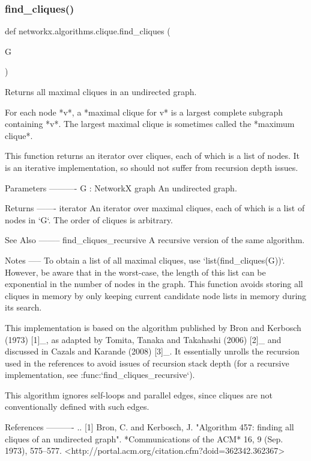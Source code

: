\subsubsection{\texorpdfstring{find\+\_\+cliques()}{find\_cliques()}}
{\footnotesize\ttfamily def networkx.\+algorithms.\+clique.\+find\+\_\+cliques (\begin{DoxyParamCaption}\item[{}]{G }\end{DoxyParamCaption})}

\begin{DoxyVerb}Returns all maximal cliques in an undirected graph.

For each node *v*, a *maximal clique for v* is a largest complete
subgraph containing *v*. The largest maximal clique is sometimes
called the *maximum clique*.

This function returns an iterator over cliques, each of which is a
list of nodes. It is an iterative implementation, so should not
suffer from recursion depth issues.

Parameters
----------
G : NetworkX graph
    An undirected graph.

Returns
-------
iterator
    An iterator over maximal cliques, each of which is a list of
    nodes in `G`. The order of cliques is arbitrary.

See Also
--------
find_cliques_recursive
    A recursive version of the same algorithm.

Notes
-----
To obtain a list of all maximal cliques, use
`list(find_cliques(G))`. However, be aware that in the worst-case,
the length of this list can be exponential in the number of nodes in
the graph. This function avoids storing all cliques in memory by
only keeping current candidate node lists in memory during its search.

This implementation is based on the algorithm published by Bron and
Kerbosch (1973) [1]_, as adapted by Tomita, Tanaka and Takahashi
(2006) [2]_ and discussed in Cazals and Karande (2008) [3]_. It
essentially unrolls the recursion used in the references to avoid
issues of recursion stack depth (for a recursive implementation, see
:func:`find_cliques_recursive`).

This algorithm ignores self-loops and parallel edges, since cliques
are not conventionally defined with such edges.

References
----------
.. [1] Bron, C. and Kerbosch, J.
   "Algorithm 457: finding all cliques of an undirected graph".
   *Communications of the ACM* 16, 9 (Sep. 1973), 575--577.
   <http://portal.acm.org/citation.cfm?doid=362342.362367>


\end{DoxyVerb}
